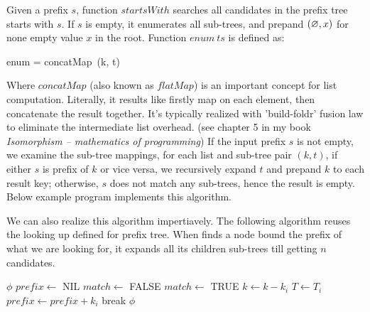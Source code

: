 \documentclass[b5paper]{article}
\begin{document}
Given a prefix $s$, function $startsWith$ searches all candidates in the prefix tree starts with $s$. If $s$ is empty, it enumerates all sub-trees, and prepand $(\varnothing, x)$ for none empty value $x$ in the root. Function $enum\ ts$ is defined as:

\be
enum = concatMap\ (k, t) 
\ee

Where $concatMap$ (also known as $flatMap$) is an important concept for list computation. Literally, it results like firstly map on each element, then concatenate the result together. It's typically realized with 'build-foldr' fusion law to eliminate the intermediate list overhead. (see chapter 5 in my book {\em Isomorphism -- mathematics of programming}) If the input prefix $s$ is not empty, we examine the sub-tree mappings, for each list and sub-tree pair $(k, t)$, if either $s$ is prefix of $k$ or vice versa, we recursively expand $t$ and prepand $k$ to each result key; otherwise, $s$ does not match any sub-trees, hence the result is empty. Below example program implements this algorithm.


We can also realize this algorithm impertiavely.
The following algorithm reuses the looking up defined for prefix tree. When
finds a node bound the prefix of what we are looking for,
it expands all its children sub-trees till getting $n$ candidates.

\begin{algorithmic}[1]
     \State \Return $\phi$
  \EndIf
  \State $prefix \gets$ NIL
  \Repeat
    \State $match \gets$ FALSE
        \State \Return {}
      \EndIf
        \State $match \gets$ TRUE
        \State $k \gets k - k_i$
        \State $T \gets T_i$
        \State $prefix \gets prefix + k_i$
        \State break
      \EndIf
    \EndFor
  \State \Return $\phi$
\EndFunction
\end{algorithmic}
\end{document}
